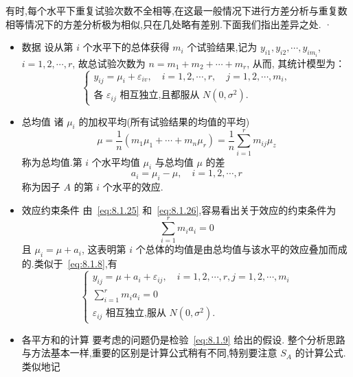 有时,每个水平下重复试验次数不全相等,在这最一般情况下进行方差分析与重复数相等情况下的方差分析极为相似,只在几处略有差别.下面我们指出差异之处.
·
\begin{itemize}
  \item 数据
  设从第 $i$ 个水平下的总体获得 $m_i$ 个试验结果,记为 $y_{i1}, y_{i2}, \cdots, y_{im_{i}}$, $i=1,2,\cdots,r$, 故总试验次数为 $n=m_1+m_2+\cdots+m_r$, 从而, 其统计模型为：
  \begin{equation}\label{eq:8.1.24}
    \begin{cases}
      y_{i j}=\mu_{i}+\varepsilon_{i v}, \quad i=1,2, \cdots, r, \quad j=1,2, \cdots, m_{i},\\
      \text{各 $\varepsilon_{ij}$ 相互独立,且都服从 $N(0,\sigma^2)$}.
    \end{cases}
  \end{equation}
  \item 总均值
  诸 $\mu_i$ 的加权平均(所有试验结果的均值的平均)
  \begin{equation}\label{eq:8.1.25}
    \mu=\frac{1}{n}\left(m_{1} \mu_{1}+\cdots+m_{n} \mu_{r}\right)=\frac{1}{n} \sum_{i=1}^{r} m_{i j} \mu_{z}
  \end{equation}
  称为总均值.第 $i$ 个水平均值 $\mu_i$ 与总均值 $\mu$ 的差
  \begin{equation}\label{eq:8.1.26}
    a_{i}=\mu_{i}-\mu, \quad i=1,2, \cdots, r
  \end{equation}
  称为因子 $A$ 的第 $i$ 个水平的效应.
  \item 效应约束条件
  由~\eqref{eq:8.1.25} 和~\eqref{eq:8.1.26},容易看出关于效应的约束条件为
  \begin{equation*}
    \sum_{i=1}^{r} m_{i} a_{i}=0
  \end{equation*}
  且 $\mu_i = \mu + a_i$, 这表明第 $i$ 个总体的均值是由总均值与该水平的效应叠加而成的.类似于~\eqref{eq:8.1.8},有
  \begin{equation}\label{eq:8.1.27}
    \begin{cases}
      y_{i j}=\mu+a_{i}+\varepsilon_{i j}, \quad i=1,2, \cdots, r, j=1,2, \cdots, m_{i}\\
      \sum_{i=1}^{r} m_{i} a_{i}=0\\
      \text{$\varepsilon_{ij}$ 相互独立,服从 $N(0,\sigma^2)$}.
    \end{cases}
  \end{equation}
  \item 各平方和的计算
  要考虑的问题仍是检验~\eqref{eq:8.1.9} 给出的假设. 整个分析思路与方法基本一样,重要的区别是计算公式稍有不同,特别要注意 $S_A$ 的计算公式. 类似地记

\end{itemize}
